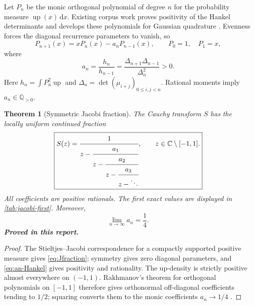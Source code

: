 \documentclass[11pt,oneside]{article}
\numberwithin{equation}{section}
\newtheorem{theorem}{Theorem}[section]
\theoremstyle{definition}
\theoremstyle{remark}
\newcommand{\C}{\mathbb C}
\newcommand{\Up}{\operatorname{up}}
\newcommand{\dd}{\,\mathrm d}
\newcommand{\statusproved}{\textcolor{proofgreen}{\textbf{Proved in this report.}}}
\begin{document}
Let \(P_n\) be the monic orthogonal polynomial of degree \(n\) for the
probability measure \(\Up(x)\dd x\).  Existing corpus work proves positivity of
the Hankel determinants and develops these polynomials for Gaussian quadrature
\cite{proveitQuadrature}.  Evenness forces the diagonal recurrence parameters
to vanish, so
\begin{equation}
 P_{n+1}(x)=xP_n(x)-a_nP_{n-1}(x),
 \qquad P_0=1,\quad P_1=x,
 \label{eq:monic-recurrence}
\end{equation}
where
\begin{equation}
 a_n=\frac{h_n}{h_{n-1}}
 =\frac{\Delta_{n+1}\Delta_{n-1}}{\Delta_n^2}>0.
 \label{eq:an-Hankel}
\end{equation}
Here \(h_n=\int P_n^2\Up\) and
\(\Delta_n=\det(\mu_{i+j})_{0\le i,j<n}\).  Rational moments imply
\(a_n\in\mathbb Q_{>0}\).

\begin{theorem}[Symmetric Jacobi fraction]
\label{thm:Jfraction}
The Cauchy transform \(S\) has the locally uniform continued fraction
\begin{equation}
 \boxed{
 S(z)=\cfrac{1}{z-\cfrac{a_1}{z-\cfrac{a_2}{z-\cfrac{a_3}{z-\ddots}}}},
 \qquad z\in\C\setminus[-1,1].}
 \label{eq:Jfraction}
\end{equation}
All coefficients are positive rationals.  The first exact values are displayed
in \cref{tab:jacobi-first}.  Moreover,
\begin{equation}
 \boxed{\lim_{n\to\infty}a_n=\frac14.}
 \label{eq:an-limit}
\end{equation}
\statusproved
\end{theorem}

\begin{proof}
The Stieltjes--Jacobi correspondence for a compactly supported positive measure
gives \eqref{eq:Jfraction}; symmetry gives zero diagonal parameters, and
\eqref{eq:an-Hankel} gives positivity and rationality.  The up-density is
strictly positive almost everywhere on \((-1,1)\).  Rakhmanov's theorem for
orthogonal polynomials on \([-1,1]\) therefore gives orthonormal off-diagonal
coefficients tending to \(1/2\); squaring converts them to the monic
coefficients \(a_n\to1/4\) \cite{simonSzego}.
\end{proof}

\begin{table}[htbp]
\centering
\caption{First Jacobi coefficients of the monic up-polynomials, computed by
exact rational Gram--Schmidt.}
\label{tab:jacobi-first}

\end{table}
\end{document}
